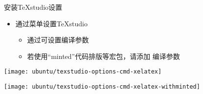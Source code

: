 \documentclass[fontset = none, t]{ctexbeamer}
\begin{document}
\begin{frame}{安装TeXstudio}{设置}
  \begin{spacing}{1.5}
    \begin{itemize}
    \item 通过菜单设置TeXstudio%
      \begin{itemize}
      \item 通过可设置\alert{编译参数}
      \item 若使用\enquote{minted}代码排版等宏包，请添加
        编译参数
      \end{itemize}
    \end{itemize}
    \begin{center}
      \begin{annotatedFigure}
        {\texttt{[image: ubuntu/texstudio-options-cmd-xelatex]}}
      \end{annotatedFigure}
      \begin{annotatedFigure}
        {\texttt{[image: ubuntu/texstudio-options-cmd-xelatex-withminted]}}
      \end{annotatedFigure} 
    \end{center}
  \end{spacing}
\end{frame}
\end{document}
